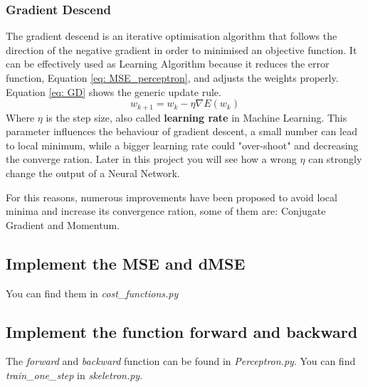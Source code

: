 \documentclass[11pt]{article}
\begin{document}
\subsubsection{Gradient Descend}
The gradient descend is an iterative optimisation algorithm that follows the direction of the negative gradient in order to minimised an objective function. It can be effectively used as Learning Algorithm because it reduces the error function, Equation \ref{eq: MSE_perceptron}, and adjusts the weights properly. Equation \ref{eq: GD} shows the generic update rule.
\begin{equation}
\label{eq: GD}
	w_{k + 1} = w_k - \eta \nabla E(w_k)
\end{equation}
Where $\eta$ is the step size, also called \textbf{learning rate} in Machine Learning. This parameter influences the behaviour of gradient descent, a small number can lead to local minimum, while a bigger learning rate could "over-shoot" and decreasing the converge ration. Later in this project you will see how a wrong $\eta$ can strongly change the output of a Neural Network.

For this reasons, numerous improvements have been proposed to avoid local minima and increase its convergence ration, some of them are: Conjugate Gradient and Momentum.
\subsection{Implement the MSE and dMSE}
You can find them in \emph{cost\_functions.py}
\subsection{Implement the function forward and backward}
The \emph{forward} and \emph{backward} function can be found in \emph{Perceptron.py}. You can find \emph{train\_one\_step} in \emph{skeletron.py}.
\end{document}
